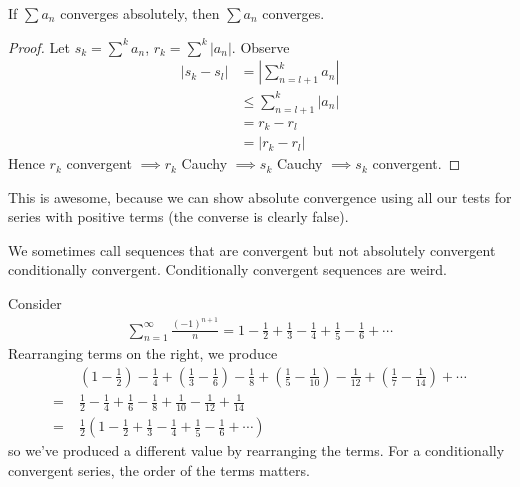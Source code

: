 \documentclass{../template/note}
\begin{document}
    \begin{lemma}
        If \(\sum a_n\) converges absolutely, then \(\sum a_n\) converges.
    \end{lemma}
    
    \begin{proof}
        Let \(s_k = \sum^k a_n\), \(r_k = \sum^k |a_n|\). Observe
        \begin{align*}
            |s_k - s_l| &= \left|\sum_{n=l+1}^k a_n\right| \\
            &\leq \sum_{n=l+1}^k |a_n| \\
            &= r_k - r_l \\
            &= |r_k - r_l|
        \end{align*}
        Hence \(r_k\) convergent \(\implies r_k\) Cauchy \(\implies s_k\) Cauchy \(\implies s_k\) convergent.        
    \end{proof}
    
    \begin{remark*}
        This is awesome, because we can show absolute convergence using all our tests for series with positive terms (the converse is clearly false).
    \end{remark*}
    
    We sometimes call sequences that are convergent but not absolutely convergent conditionally convergent. Conditionally convergent sequences are weird.

    \begin{example}
        Consider
        \begin{align*}
            \sum_{n=1}^\infty \frac{(-1)^{n+1}}{n} = 1 - \frac 1 2 + \frac 1 3 - \frac 1 4 + \frac 1 5 - \frac 1 6 + \cdots
        \end{align*}
        Rearranging terms on the right, we produce
        \begin{align*}
            &\;\left(1 - \frac 1 2\right) - \frac 1 4 + \left(\frac 1 3 - \frac 1 6\right) - \frac 1 8 + \left(\frac 1 5 - \frac 1 {10}\right) - \frac 1 {12} + \left(\frac 1 7 - \frac 1 {14}\right) + \cdots \\
            =&\; \frac 1 2 - \frac 1 4 + \frac 1 6 - \frac 1 8 + \frac 1 {10} - \frac 1 {12} + \frac 1 {14} \\
            =&\; \frac 1 2 \left(1 - \frac 1 2 + \frac 1 3 - \frac 1 4 + \frac 1 5 - \frac 1 6 + \cdots\right)
        \end{align*}
        so we've produced a different value by rearranging the terms. For a conditionally convergent series, the order of the terms matters.       
    \end{example}
    
\end{document}
